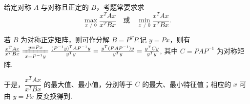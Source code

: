 给定对称 $A$ 与对称且正定的 $B$，考题常要求求
\[
    \max_{x\ne0}\frac{x^TAx}{x^TBx}\quad\text{或}\quad\min_{x\ne0}\frac{x^TAx}{x^TBx}.
\]

若 $B$ 为对称正定矩阵，则可作分解 $B=P^TP$.记 $y=Px$，则有
$\frac{x^TAx}{x^TBx}\xlongequal[x=P^{-1}y]{y=Px} \frac{(P^{-1}y)^TAP^{-1}y}{y^Ty}=\frac{y^T(PAP^{-1})y}{y^Ty}=\frac{y^TCy}{y^Ty}$,
其中 $C=PAP^{-1}$ 为对称矩阵.

于是，$\dfrac{x^TAx}{x^TBx}$ 的最大值、最小值，分别等于 $C$ 的最大、最小特征值；相应的 $x$ 可由 $y=Px$ 反变换得到.
